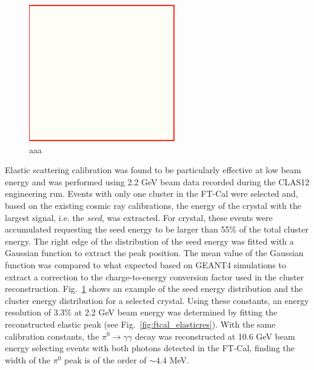 \begin{figure}
\includegraphics[height=1.0\columnwidth]{fig/dummy.png}
\caption{aaa}
\label{fig:ftcal_elasticcal}
\end{figure}
Elastic scattering calibration was found to be particularly effective at low beam energy and was performed using 2.2 GeV beam data recorded during the CLAS12 engineering run. Events with only one cluster in the FT-Cal were selected and, based on the existing cosmic ray calibrations, the energy of the crystal with the largest signal, i.e. the {\it seed}, was extracted. For crystal, these events were accumulated requesting the seed energy to be larger than 55\% of the total cluster energy. The right edge of the distribution of the seed energy was fitted with a Gaussian function to extract the peak position. The mean value of the Gaussian function was compared to what expected based on GEANT4 simulations to extract a correction to the charge-to-energy conversion factor used in the cluster reconstruction. Fig.~\ref{fig:ftcal_elasticcal} shows an example of the seed energy distribution and the cluster energy distribution for a selected crystal. Using these constants, an energy resolution of  3.3\% at 2.2 GeV beam energy was determined by fitting the reconstructed elastic peak (see Fig.~\ref{fig:ftcal_elasticres}). With the same calibration constants, the $\pi^0\to\gamma\gamma$ decay was reconstructed at 10.6 GeV beam energy selecting events with both photons detected in the FT-Cal, finding the width of the $\pi^0$ peak is of the order of $\sim 4.4$ MeV.

